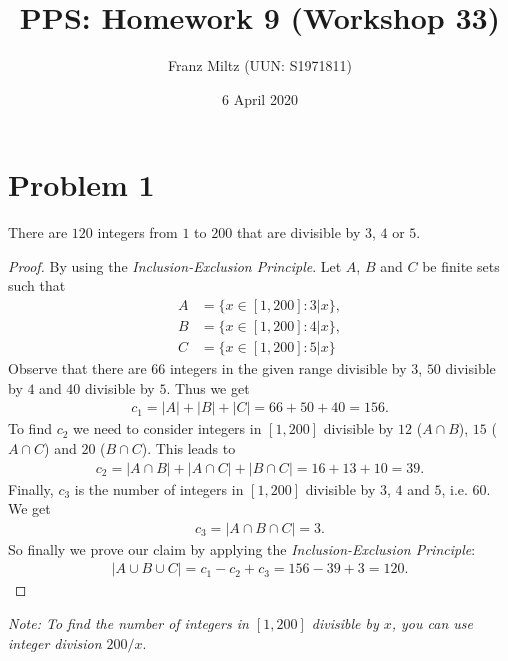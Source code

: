 \documentclass{article}
\title{PPS: Homework 9 (Workshop 33)}
\author{Franz Miltz (UUN: S1971811)}
\date{6 April 2020}
\begin{document}
\maketitle

\section*{Problem 1}
\begin{claim}
	There are $120$ integers from $1$ to $200$ that are divisible by $3$, $4$ or $5$.
\end{claim}
\begin{proof}
	By using the \emph{Inclusion-Exclusion Principle}.
	Let $A$, $B$ and $C$ be finite sets such that
	\begin{align*}
		A & = \{x\in [1,200] : 3 | x\}, \\
		B & = \{x \in [1,200] : 4|x\},  \\
		C & = \{x\in [1,200] : 5|x\}
	\end{align*}
	Observe that there are $66$ integers in the given range divisible by $3$, $50$ divisible by $4$ and $40$ divisible by $5$.
	Thus we get
	\begin{align*}
		c_1 = |A| + |B| + |C| = 66 + 50 + 40 = 156.
	\end{align*}
	To find $c_2$ we need to consider integers in $[1,200]$ divisible by $12$ ($A\cap B$), $15$ ($A\cap C$) and $20$ ($B\cap C$). This leads to
	\begin{align*}
		c_2 = |A\cap B| + |A\cap C| + |B \cap C| = 16 + 13 + 10 = 39.
	\end{align*}
	Finally, $c_3$ is the number of integers in $[1,200]$ divisible by $3$, $4$ and $5$, i.e. $60$. We get
	\begin{align*}
		c_3 = |A\cap B \cap C| = 3.
	\end{align*}
	So finally we prove our claim by applying the \emph{Inclusion-Exclusion Principle}:
	\begin{align*}
		|A\cup B \cup C| = c_1- c_2 + c_3 = 156 - 39 + 3 = 120.
	\end{align*}
\end{proof}
\noindent\emph{Note: To find the number of integers in $[1,200]$ divisible by $x$, you can use integer division $200 / x$}.
\end{document}
